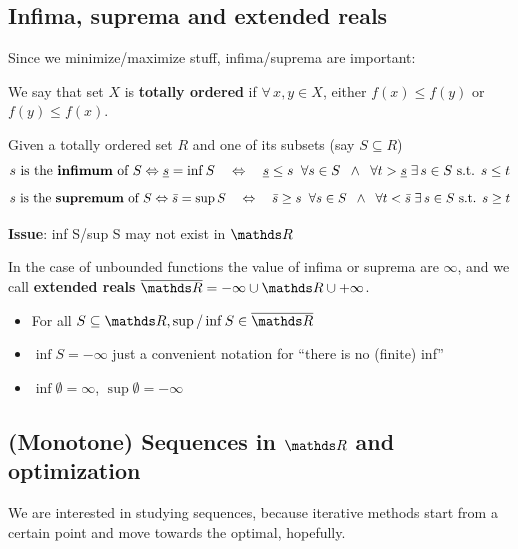 \documentclass[computationalMathematics.tex]{subfiles}
\begin{document}
\subsection{Infima, suprema and extended reals}
\noindent Since we minimize/maximize stuff, infima/suprema are important:
\begin{definition}
  We say that  set $X$ is \textbf{totally ordered} if $\forall \, x, y \in X$, either $f(x) \leq f(y)$ or $f(y) \leq f(x)$.
\end{definition}

\begin{definition}
  Given a totally ordered set $R$ and one of its subsets (say $S \subseteq R$)
\[
  s\text{ is the {\bf infimum} of } S \Leftrightarrow \underline{s} = \inf S
  \quad\Leftrightarrow\quad
  \underline{s} \leq s \;\; \forall s \in S
  \;\;\wedge\;\;
  \forall t > \underline{s} \; \exists \, s \in S \mbox{ s.t. } s \leq t
\]
\[
  s \text{ is the {\bf supremum} of } S \Leftrightarrow \bar{s} = \sup S
  \quad\Leftrightarrow\quad
  \bar{s} \geq s \;\; \forall s \in S
  \;\;\wedge\;\;
  \forall t < \bar{s} \; \exists \, s \in S \mbox{ s.t. } s \geq t
\]
\end{definition}

\noindent \textbf{Issue}: inf S/sup S may not exist in $\R$

\begin{definition}
  In the case of unbounded functions the value of infima or suprema are $\infty$, and we call \textbf{extended reals} $\overline{\R} = {-\infty} \cup \R \cup {+\infty}$.
\end{definition}

\begin{itemize}
    \item For all $S \subseteq \R, \sup / \inf S \in \overline{\R}$
    \item $\inf S = -\infty $ just a convenient notation for “there is no (finite) inf”
    \item $\inf \emptyset = \infty$, $\sup \emptyset = -\infty$
\end{itemize}

\subsection{(Monotone) Sequences in $\R$ and optimization}
\noindent We are interested in studying sequences, because iterative methods start from a certain point and move towards the optimal, hopefully.\\
\end{document}
